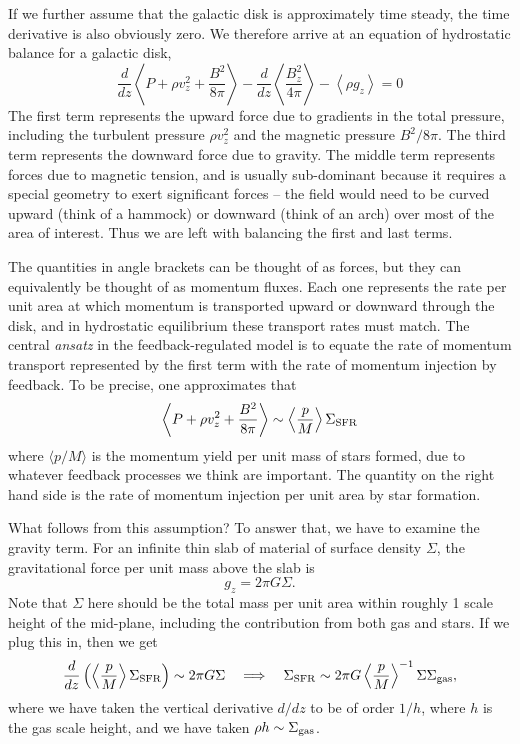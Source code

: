 If we further assume that the galactic disk is approximately time steady, the time derivative is also obviously zero. We therefore arrive at an equation of hydrostatic balance for a galactic disk,
\begin{equation}
\frac{d}{dz} \left\langle P + \rho v_z^2 + \frac{B^2}{8\pi}\right \rangle  - \frac{d}{dz} \left\langle\frac{B_z^2}{4\pi}\right\rangle - \left\langle \rho g_z\right\rangle = 0
\end{equation}
The first term represents the upward force due to gradients in the total pressure, including the turbulent pressure $\rho v_z^2$ and the magnetic pressure $B^2/8\pi$. The third term represents the downward force due to gravity. The middle term represents forces due to magnetic tension, and is usually sub-dominant because it requires a special geometry to exert significant forces -- the field would need to be curved upward (think of a hammock) or downward (think of an arch) over most of the area of interest. Thus we are left with balancing the first and last terms.

The quantities in angle brackets can be thought of as forces, but they can equivalently be thought of as momentum fluxes. Each one represents the rate per unit area at which momentum is transported upward or downward through the disk, and in hydrostatic equilibrium these transport rates must match. The central \textit{ansatz} in the feedback-regulated model is to equate the rate of momentum transport represented by the first term with the rate of momentum injection by feedback. To be precise, one approximates that
\begin{equation}
\left \langle P + \rho v_z^2 + \frac{B^2}{8\pi}\right \rangle \sim \left\langle\frac{p}{M}\right\rangle \Sigma_{\rm SFR}
\end{equation}
where $\langle p/M\rangle$ is the momentum yield per unit mass of stars formed, due to whatever feedback processes we think are important. The quantity on the right hand side is the rate of momentum injection per unit area by star formation.

What follows from this assumption? To answer that, we have to examine the gravity term. For an infinite thin slab of material of surface density $\Sigma$, the gravitational force per unit mass above the slab is
\begin{equation}
g_z = 2\pi G \Sigma.
\end{equation}
Note that $\Sigma$ here should be the total mass per unit area within roughly 1 scale height of the mid-plane, including the contribution from both gas and stars. If we plug this in, then we get
\begin{equation}
\frac{d}{dz} \left(\left\langle \frac{p}{M}\right\rangle \Sigma_{\rm SFR}\right) \sim 2\pi G \Sigma
\quad \Longrightarrow \quad
\Sigma_{\rm SFR} \sim 2\pi G \left\langle \frac{p}{M}\right\rangle^{-1} \Sigma \Sigma_{\rm gas} ,
\end{equation}
where we have taken the vertical derivative $d/dz$ to be of order $1/h$, where $h$ is the gas scale height, and we have taken $\rho h \sim \Sigma_{\rm gas}$.

